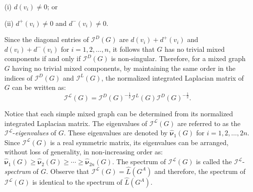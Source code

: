 \documentclass[12pt]{article}
\numberwithin{equation}{section}
\newtheorem{example}{Example}[section]
\begin{document}
	(i) $d(v_i)\neq 0$; or
	
	(ii) $d^+(v_i)\neq 0$ and $d^-(v_i)\neq 0$. 
	
	Since the diagonal entries of $\mathcal{I}^D(G)$ are $d(v_i)+d^+(v_i)$ and $d(v_i)+d^-(v_i)$ for $i=1,2,\ldots,n$, it follows that $G$ has no trivial mixed components if and only if $\mathcal{I}^D(G)$ is non-singular. Therefore, for a mixed graph $G$ having no trivial mixed components, by maintaining the same order in the indices of $\mathcal{I}^D(G)$ and $\mathcal{I}^L(G)$, the normalized integrated Laplacian matrix of $G$ can be written as:
	$$\mathcal{I}^\mathcal{L}(G)=\mathcal{I}^D(G)^{-\frac{1}{2}}\mathcal{I}^L(G)\mathcal{I}^D(G)^{-\frac{1}{2}}.$$
	
	Notice that each simple mixed graph can be determined from its normalized integrated Laplacian matrix. The eigenvalues of $\mathcal{I}^\mathcal{L}(G)$ are referred to as the $\mathcal{I}^\mathcal{L}$-\textit{eigenvalues} of $G$. These eigenvalues are denoted by $\hat{\bm{\nu}}_1(G)$ for $i=1,2,\ldots,2n$. Since $\mathcal{I}^\mathcal{L}(G)$  is a real symmetric matrix, its eigenvalues can be arranged, without loss of generality, in non-increasing order as: $\hat{\bm{\nu}}_1(G)\geq\hat{\bm{\nu}}_2(G)\geq\cdots\geq\hat{\bm{\nu}}_{2n}(G)$. The spectrum of $\mathcal{I}^\mathcal{L}(G)$ is called the $\mathcal{I}^\mathcal{L}$-\textit{spectrum} of $G$. Observe that  $\mathcal{I}^\mathcal{L}(G)=\widehat{L}(G^A)$ and therefore,  the spectrum of $\mathcal{I}^\mathcal{L}(G)$ is identical to the spectrum of  $\widehat{L}(G^A)$. 
	
	
\end{document}
